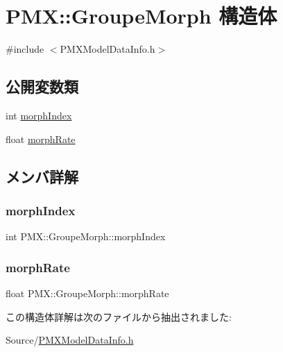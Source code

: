 \hypertarget{struct_p_m_x_1_1_groupe_morph}{}\section{P\+MX\+:\+:Groupe\+Morph 構造体}
\label{struct_p_m_x_1_1_groupe_morph}


{\ttfamily \#include $<$P\+M\+X\+Model\+Data\+Info.\+h$>$}

\subsection*{公開変数類}
\begin{DoxyCompactItemize}
\item 
int \mbox{\hyperlink{struct_p_m_x_1_1_groupe_morph_a8117c54ddebf44cad0e290b6b6fcd6e0}{morph\+Index}}
\item 
float \mbox{\hyperlink{struct_p_m_x_1_1_groupe_morph_a687da3091429d1a661c6edf018769347}{morph\+Rate}}
\end{DoxyCompactItemize}


\subsection{メンバ詳解}
\mbox{\label{struct_p_m_x_1_1_groupe_morph_a8117c54ddebf44cad0e290b6b6fcd6e0}} 
\subsubsection{\texorpdfstring{morph\+Index}{morphIndex}}
{\footnotesize\ttfamily int P\+M\+X\+::\+Groupe\+Morph\+::morph\+Index}

\mbox{\label{struct_p_m_x_1_1_groupe_morph_a687da3091429d1a661c6edf018769347}} 
\subsubsection{\texorpdfstring{morph\+Rate}{morphRate}}
{\footnotesize\ttfamily float P\+M\+X\+::\+Groupe\+Morph\+::morph\+Rate}



この構造体詳解は次のファイルから抽出されました\+:\begin{DoxyCompactItemize}
\item 
Source/\mbox{\hyperlink{_p_m_x_model_data_info_8h}{P\+M\+X\+Model\+Data\+Info.\+h}}\end{DoxyCompactItemize}
